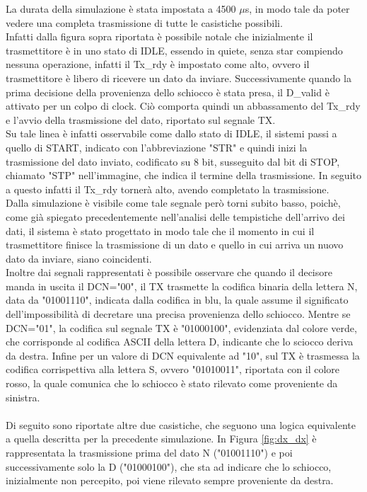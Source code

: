 \documentclass[a4paper, titlepage]{article}
\begin{document}
\noindent La durata della simulazione è stata impostata a 4500 $\mu$s, in modo tale da poter vedere una completa trasmissione di tutte le casistiche possibili.\\Infatti dalla figura sopra riportata è possibile notale che inizialmente il trasmettitore è in uno stato di IDLE, essendo in quiete, senza star compiendo nessuna operazione, infatti il Tx\_rdy è impostato come alto, ovvero il trasmettitore è libero di ricevere un dato da inviare. Successivamente quando la prima decisione della provenienza dello schiocco è stata presa, il D\_valid è attivato per un colpo di clock. Ciò comporta quindi un abbassamento del Tx\_rdy e l'avvio della trasmissione del dato, riportato sul segnale TX.\\Su tale linea è infatti osservabile come dallo stato di IDLE, il sistemi passi a quello di START, indicato con l'abbreviazione "STR" e quindi inizi la trasmissione del dato inviato, codificato su 8 bit, susseguito dal bit di STOP, chiamato "STP" nell'immagine, che indica il termine della trasmissione. In seguito a questo infatti il Tx\_rdy tornerà alto, avendo completato la trasmissione.\\Dalla simulazione è visibile come tale segnale però torni subito basso, poichè, come già spiegato precedentemente nell'analisi delle tempistiche dell'arrivo dei dati, il sistema è stato progettato in modo tale che il momento in cui il trasmettitore finisce la trasmissione di un dato e quello in cui arriva un nuovo dato da inviare, siano coincidenti.\\Inoltre dai segnali rappresentati è possibile osservare che quando il decisore manda in uscita il DCN="00", il TX trasmette la codifica binaria della lettera N, data da "01001110", indicata dalla codifica in blu, la quale assume il significato dell'impossibilità di decretare una precisa provenienza dello schiocco. Mentre se DCN="01", la codifica sul segnale TX è "01000100", evidenziata dal colore verde, che corrisponde al codifica ASCII della lettera D, indicante che lo sciocco deriva da destra. Infine per un valore di DCN equivalente ad "10", sul TX è trasmessa la codifica corrispettiva alla lettera S, ovvero "01010011", riportata con il colore rosso, la quale comunica che lo schiocco è stato rilevato come proveniente da sinistra.\\\\Di seguito sono riportate altre due casistiche, che seguono una logica equivalente a quella descritta per la precedente simulazione. In Figura \ref{fig:dx_dx} è rappresentata la trasmissione prima del dato N ("01001110") e poi successivamente solo la D ("01000100"), che sta ad indicare che lo schiocco, inizialmente non percepito, poi viene rilevato sempre proveniente da destra.
\end{document}
